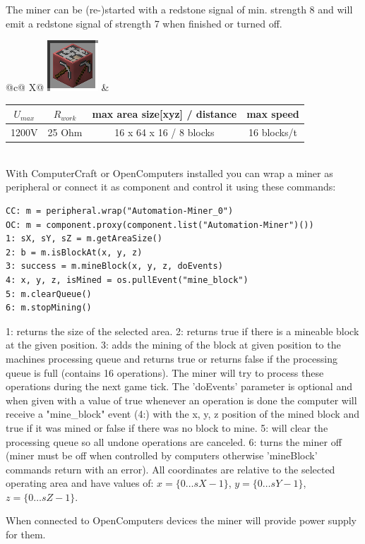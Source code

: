 \documentclass[11pt]{article} %
\makeatletter
\newcommand{\imgtex}{\begin{tabularx}{\textwidth}{@{}c@{ }X@{}}}
\makeatother
\begin{document}
The miner can be (re-)started with a redstone signal of min. strength 8 and will emit a redstone signal of strength 7 when finished or turned off.\\
\imgtex
\includegraphics[align = m]{blockMiner} &
\begin{tabular}{| c | c | c | c |} \hline
\bf $U_{max}$ & \bf $R_{work}$ & \bf max area size[xyz] / distance & \bf max speed \\ \hline
1200V & 25 Ohm & 16 x 64 x 16 / 8 blocks & 16 blocks/t \\ \hline
\end{tabular}
\end{tabularx} \\
With ComputerCraft or OpenComputers installed you can wrap a miner as peripheral or connect it as component and control it using these commands:
\begin{lstlisting}
CC: m = peripheral.wrap("Automation-Miner_0")
OC: m = component.proxy(component.list("Automation-Miner")())
1: sX, sY, sZ = m.getAreaSize() 
2: b = m.isBlockAt(x, y, z) 
3: success = m.mineBlock(x, y, z, doEvents)
4: x, y, z, isMined = os.pullEvent("mine_block")
5: m.clearQueue()
6: m.stopMining()
\end{lstlisting}
1: returns the size of the selected area. 2: returns true if there is a mineable block at the given position. 3: adds the mining of the block at given position to the machines processing queue and returns true or returns false if the processing queue is full (contains 16 operations). The miner will try to process these operations during the next game tick. The 'doEvents' parameter is optional and when given with a value of true whenever an operation is done the computer will receive a "mine\_block" event (4:) with the x, y, z position of the mined block and true if it was mined or false if there was no block to mine. 5: will clear the processing queue so all undone operations are canceled. 6: turns the miner off (miner must be off when controlled by computers otherwise 'mineBlock' commands return with an error). All coordinates are relative to the selected operating area and have values of: $x=\{0 \dots sX-1\}$, $y=\{0 \dots sY - 1\}$, $z=\{0 \dots sZ - 1\}$.

When connected to OpenComputers devices the miner will provide power supply for them.
\end{document}
